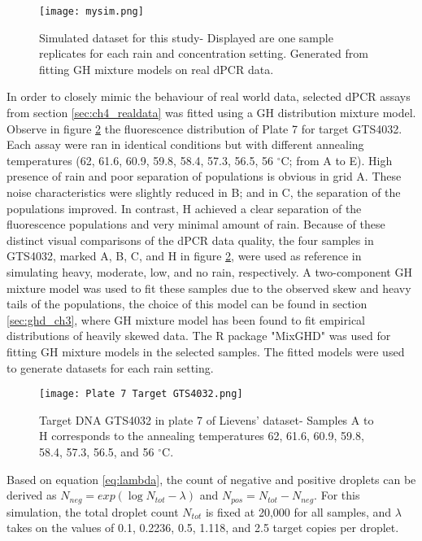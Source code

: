 \begin{figure}[h]
    \centering
    \texttt{[image: mysim.png]}
    \caption[Simulated dataset for this study]{Simulated dataset for this study- Displayed are one sample replicates for each rain and concentration setting. Generated from fitting GH mixture models on real dPCR data.}
        \label{fig:mysim}
\end{figure}

In order to closely mimic the behaviour of real world data, selected dPCR assays from section \ref{sec:ch4_realdata} was fitted using a GH distribution mixture model. Observe in figure \ref{fig:realdata_gts} the fluorescence distribution of Plate 7 for target GTS4032. Each assay were ran in identical conditions but with different annealing temperatures (62, 61.6, 60.9, 59.8, 58.4, 57.3, 56.5, 56 \(^{\circ}\)C; from A to E). High presence of rain and poor separation of populations is obvious in grid A. These noise characteristics were slightly reduced in B; and in C, the separation of the populations improved. In contrast, H achieved a clear separation of the fluorescence populations and very minimal amount of rain. Because of these distinct visual comparisons of the dPCR data quality, the four samples in GTS4032, marked A, B, C, and H in figure \ref{fig:realdata_gts}, were used as reference in simulating heavy, moderate, low, and no rain, respectively. A two-component GH mixture model was used to fit these samples due to the observed skew and heavy tails of the populations, the choice of this model can be found in section \ref{sec:ghd_ch3}, where GH mixture model has been found to fit empirical distributions of heavily skewed data. The R package "MixGHD" \cite{MixGHD} was used for fitting GH mixture models in the selected samples. The fitted models were used to generate datasets for each rain setting.

\begin{figure}[h]
    \centering
    \texttt{[image: Plate 7 Target GTS4032.png]}
    \caption[Target DNA GTS4032 in plate 7 of Lievens' dataset]%
    {Target DNA GTS4032 in plate 7 of Lievens' dataset- Samples A to H corresponds to the annealing temperatures 62, 61.6, 60.9, 59.8, 58.4, 57.3, 56.5, and 56 \(^{\circ}\)C.}
        \label{fig:realdata_gts}
\end{figure}

Based on equation \ref{eq:lambda}, the count of negative and positive droplets can be derived as \(N_{neg} = exp(\log{N_{tot}} - \lambda)\) and \(N_{pos} = N_{tot} - N_{neg}\). For this simulation, the total droplet count \(N_{tot}\) is fixed at 20,000 for all samples, and \(\lambda\) takes on the values of 0.1, 0.2236, 0.5, 1.118, and 2.5 target copies per droplet. 

